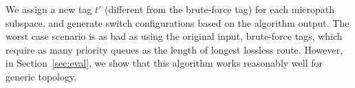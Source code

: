 We assign a new tag $t'$ (different from the brute-force tag) for each micropath subspace, and generate switch configurations
based on the algorithm output. The worst case scenario is as bad as using the original input, brute-force tags, which require
as many priority queues as the length of longest lossless route. However,
in Section~\ref{sec:eval}, we show that this algorithm works reasonably well for generic topology. 


%	
%
%	
